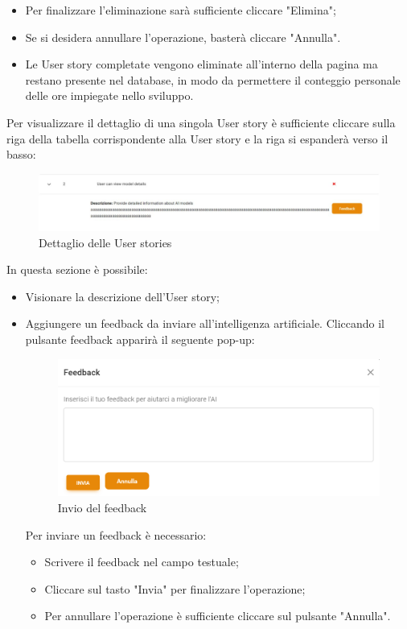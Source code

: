 \documentclass{article}
\begin{document}
    \begin{itemize}
        \item Per finalizzare l'eliminazione sarà sufficiente cliccare "Elimina";
        \item Se si desidera annullare l'operazione, basterà cliccare "Annulla".
        \item Le User story completate vengono eliminate all'interno della pagina ma restano presente nel database, in modo da permettere il conteggio personale delle ore impiegate nello sviluppo.
    \end{itemize}
Per visualizzare il dettaglio di una singola User story è sufficiente cliccare sulla riga della tabella corrispondente alla User story e la riga si espanderà verso il basso:
    \begin{figure}[H]
      \centering
      \includegraphics[width=\textwidth]{documenti/Screenshot manuale utente/dettaglio userstory dev.jpeg}
      \caption{Dettaglio delle User stories}
      \label{dettaglio user}
    \end{figure}
In questa sezione è possibile:
\begin{itemize}
    \item Visionare la descrizione dell'User story;
    \item Aggiungere un feedback da inviare all'intelligenza artificiale. Cliccando il pulsante feedback apparirà il seguente pop-up:
    \begin{figure}[H]
      \centering
      \includegraphics[width=\textwidth]{documenti/Screenshot manuale utente/feedback.png}
      \caption{Invio del feedback}
      \label{feedback}
    \end{figure}
    Per inviare un feedback è necessario:
    \begin{itemize}
        \item Scrivere il feedback nel campo testuale;
        \item Cliccare sul tasto "Invia" per finalizzare l'operazione;
        \item Per annullare l'operazione è sufficiente cliccare sul pulsante "Annulla".
    \end{itemize}
\end{itemize}
\end{document}
